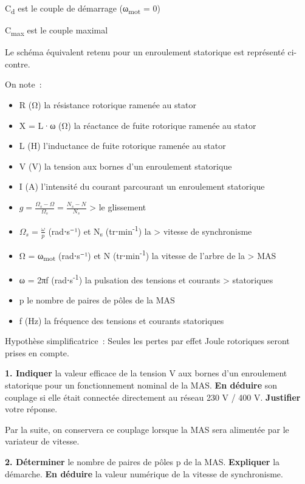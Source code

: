 C\textsubscript{d} est le couple de démarrage (ω\textsubscript{mot} = 0)

C\textsubscript{max} est le couple maximal

Le schéma équivalent retenu pour un enroulement statorique est représenté ci-contre.

On note~:

\begin{itemize}
\item
  R (Ω) la résistance rotorique ramenée au stator
\item
  X = L·ω (Ω) la réactance de fuite rotorique ramenée au stator
\item
  L (H) l'inductance de fuite rotorique ramenée au stator
\item
  V (V) la tension aux bornes d'un enroulement statorique
\item
  I (A) l'intensité du courant parcourant un enroulement statorique
\item
  \(g = \frac{\Omega_{s} - \Omega}{\Omega_{s}} = \frac{N_{s} - N}{N_{s}}\) \textgreater{} le glissement
\item
  \(\Omega_{s} = \frac{\omega}{p}\) (rad⋅s⁻¹) et N\textsubscript{s} (tr⋅min\textsuperscript{-1}) la \textgreater{} vitesse de synchronisme
\item
  Ω = ω\textsubscript{mot} (rad⋅s⁻¹) et N (tr⋅min\textsuperscript{-1}) la vitesse de l'arbre de la \textgreater{} MAS
\item
  ω = 2πf (rad⋅s\textsuperscript{-1}) la pulsation des tensions et courants \textgreater{} statoriques
\item
  p le nombre de paires de pôles de la MAS
\item
  f (Hz) la fréquence des tensions et courants statoriques
\end{itemize}

Hypothèse simplificatrice~: Seules les pertes par effet Joule rotoriques seront prises en compte.

\textbf{1. Indiquer} la valeur efficace de la tension V aux bornes d'un enroulement statorique pour un fonctionnement nominal de la MAS. \textbf{En déduire} son couplage si elle était connectée directement au réseau 230 V / 400 V. \textbf{Justifier} votre réponse.

Par la suite, on conservera ce couplage lorsque la MAS sera alimentée par le variateur de vitesse.

\textbf{2. Déterminer} le nombre de paires de pôles p de la MAS. \textbf{Expliquer} la démarche. \textbf{En déduire} la valeur numérique de la vitesse de synchronisme.

